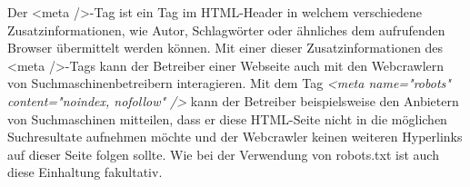 Der <meta />-Tag ist ein Tag im HTML-Header in welchem verschiedene Zusatzinformationen, wie Autor, Schlagwörter oder ähnliches dem aufrufenden Browser übermittelt werden können. Mit einer dieser Zusatzinformationen des <meta />-Tags kann der Betreiber einer Webseite auch mit den Webcrawlern von Suchmaschinenbetreibern interagieren. Mit dem Tag \emph{<meta name="robots" content="noindex, nofollow" />} kann der Betreiber beispielsweise den Anbietern von Suchmaschinen mitteilen, dass er diese HTML-Seite nicht in die möglichen Suchresultate aufnehmen möchte und der Webcrawler keinen weiteren Hyperlinks auf dieser Seite folgen sollte\cite{meta-w3c}.
Wie bei der Verwendung von robots.txt ist auch diese Einhaltung fakultativ.\cite{meta-beispiel}